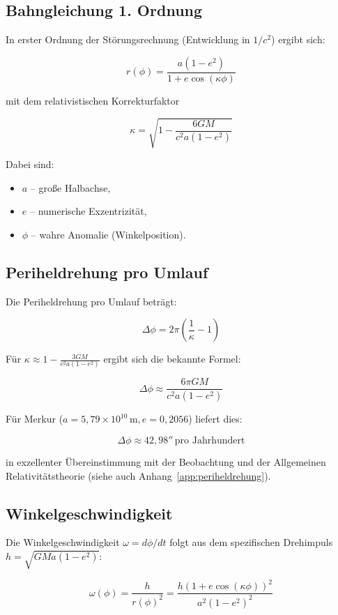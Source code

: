 \subsection{Bahngleichung 1. Ordnung}
\label{sec:weber_bahn_1ordnung}

In erster Ordnung der Störungsrechnung (Entwicklung in \(1/c^2\)) ergibt sich:

\[
r(\phi) = \frac{a(1-e^2)}{1 + e \cos(\kappa\phi)}
\]

mit dem relativistischen Korrekturfaktor

\[
\kappa = \sqrt{1 - \frac{6GM}{c^2 a(1-e^2)}}
\]

Dabei sind:
\begin{itemize}
    \item \(a\) – große Halbachse,
    \item \(e\) – numerische Exzentrizität,
    \item \(\phi\) – wahre Anomalie (Winkelposition).
\end{itemize}

\subsection{Periheldrehung pro Umlauf}
\label{sec:weber_periheldrehung}

Die Periheldrehung pro Umlauf beträgt:

\[
\Delta\phi = 2\pi\left(\frac{1}{\kappa} - 1\right)
\]

Für \(\kappa \approx 1 - \frac{3GM}{c^2 a(1-e^2)}\) ergibt sich die bekannte Formel:

\[
\Delta\phi \approx \frac{6\pi GM}{c^2 a(1-e^2)}
\]

Für Merkur (\(a = 5,79 \times 10^{10} \, \text{m}, e = 0,2056\)) liefert dies:

\[
\Delta\phi \approx 42,98'' \, \text{pro Jahrhundert}
\]

in exzellenter Übereinstimmung mit der Beobachtung und der Allgemeinen Relativitätstheorie (siehe auch Anhang~\ref{app:periheldrehung}).

\subsection{Winkelgeschwindigkeit}
\label{sec:weber_winkelgeschw}

Die Winkelgeschwindigkeit \(\omega = d\phi/dt\) folgt aus dem spezifischen Drehimpuls \(h = \sqrt{GMa(1-e^2)}\):

\[
\omega(\phi) = \frac{h}{r(\phi)^2} = \frac{h (1 + e \cos(\kappa\phi))^2}{a^2 (1-e^2)^2}
\]

